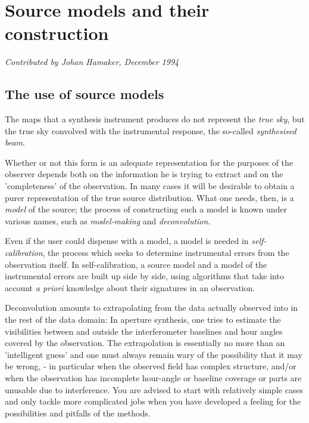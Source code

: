 \newcommand{\noi}{\noindent}
\newcommand{\bi}{\begin{itemize}}
\newcommand{\ei}{\end{itemize}}

\chapter{\centering Source models and their construction }
{\par \em Contributed by Johan Hamaker, December 1994 \centering \par}

\tableofcontents

\section{ The use of source models }
\label{.source.use}

	The maps that a synthesis instrument produces do not represent the {\em
true sky}, but the true sky convolved with the instrumental response, the
so-called {\em synthesised beam}.

	Whether or not this form is an adequate representation for the purposes
of the observer depends both on the information he is trying to extract and on
the 'completeness' of the observation. In many cases it will be desirable to
obtain a purer representation of the true source distribution. What one needs,
then, is a {\em model} of the source; the process of constructing such a model
is known under various names, such as {\em model-making} and {\em
deconvolution}.

	Even if the user could dispense with a model, a model is needed in {\em
self-calibration}, the process which seeks to determine instrumental errors
from the observation itself. In self-calibration, a source model and a model of
the instrumental errors are built up side by side, using algorithms that take
into account {\em a priori} knowledge about their signatures in an observation.

	Deconvolution amounts to extrapolating from the data actually observed
into in the rest of the data domain: In aperture synthesis, one tries to
estimate the visibilities between and outside the interferometer baselines and
hour angles covered by the observation. The extrapolation is essentially no
more than an 'intelligent guess' and one must always remain wary of the
possibility that it may be wrong, - in particular when the observed field has
complex structure, and/or when the observation has incomplete hour-angle or
baseline coverage or parts are unusable due to interference. You are advised to
start with relatively simple cases and only tackle more complicated jobs when
you have developed a feeling for the possibilities and pitfalls of the methods.


